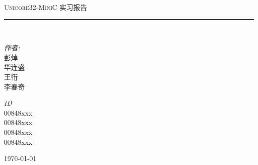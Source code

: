 \newcommand{\HRule}{\rule{\linewidth}{0.5mm}}
\begin{titlepage}
	\begin{center}
		\phantom{placeholder}
		\vspace{6cm}
		\textsc{\LARGE Unicore32-MiniC }{\LARGE 实习报告}\\[2cm]
		\HRule\\[5cm]
		\begin{minipage}{0.4\textwidth}
			\begin{center} \large
				\emph{作者:}\\
				彭焯\\
				华连盛\\ 
				王衎\\
				李春奇\\ 
			\end{center}
		\end{minipage}
		\begin{minipage}{0.4\textwidth}
			\begin{center} \large
				\emph{ID} \\
				00848xxx\\
				00848xxx\\
				00848xxx\\
				00848xxx\\
			\end{center}
		\end{minipage}

		\vfill

		{\large \today}

	\end{center}

\end{titlepage}
